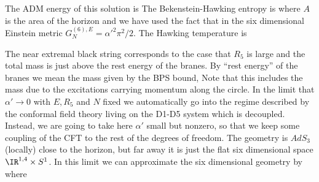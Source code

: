 The ADM energy of this solution is
The Bekenstein-Hawking entropy is
where $A$ is the area of the horizon and
we have used the fact that in the six dimensional Einstein metric
$G_N^{(6),E} =  {\alpha'}^2 \pi^2/2$.
The Hawking temperature is

The near extremal black string corresponds to the case that 
 $R_5$ is large and the total mass is just above the rest 
energy of the branes. By ``rest energy'' of the branes we 
mean the mass given by the BPS bound,
Note that this includes the mass due to the excitations carrying 
momentum along the circle.
In the limit that $ \alpha' \to 0 $ with $E , R_5 $ and $N$ fixed we
automatically go into the regime described by the conformal field
theory living on the D1-D5 system which is decoupled.
Instead, we are going to take here $\alpha'$ small but nonzero, so that
we keep some coupling of the CFT to the rest of the degrees of freedom.
The geometry is $AdS_3$ (locally) close to the horizon, but  far away
it is just the flat six dimensional space $\IR^{1,4}\times S^1$. 
In this limit we can approximate the six dimensional geometry by 
where 


